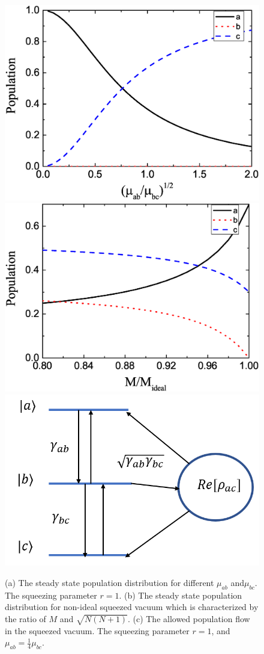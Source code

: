 \documentclass{article}
\begin{document}
\begin{figure}
\includegraphics[width=0.48\columnwidth]{atom_fig4.eps}
\includegraphics[width=0.48\columnwidth]{atom_fig5.eps}
\includegraphics[width=0.4\columnwidth]{atom_fig3.png}
\caption{(a) The steady state population distribution for different $\mu_{ab}$ and$\mu_{bc}$. The squeezing parameter $r=1$. (b) The steady state population distribution for non-ideal squeezed vacuum which is characterized by the ratio of $M$ and $\sqrt{N(N+1)}$. (c) The allowed population flow in the squeezed vacuum. The squeezing parameter $r=1$, and $\mu_{ab}=\frac{1}{4}\mu_{bc}$.}
\label{2}
\end{figure}
\end{document}
